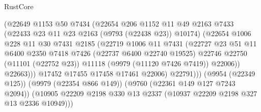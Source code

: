 \begin{lexlean}{RustCore}
\begin{coremodule}
                                  (@22649
                                    @1153
                                    @50
                                    @7434
                                    (@22654
                                      @206
                                      @1152
                                      @11
                                      @49
                                      @2163
                                      @7433
                                      (@22433 @23 @11 @23 @2163 (@9793 (@22438 @23)) @10174)
                                      (@22654
                                        @1006
                                        @228
                                        @11
                                        @30
                                        @7431
                                        @2185
                                        (@22719
                                          @1006
                                          @11
                                          @7431
                                          (@22727
                                            @23
                                            @51
                                            @11
                                            @6400
                                            @2350
                                            @7418
                                            @7426
                                            (@22737 @6400 @22740 @19525)
                                            @22746
                                            @22750
                                            (@11101 (@22752 @23))
                                            @11118
                                            (@9979 (@11120 @7426 @7419))
                                            @22006))
                                        @22663)))
                                  @17452
                                  @17455
                                  @17458
                                  @17461
                                  @22006)
                                @22791)))
                          (@9954 (@22349 @125))
                          (@9979 (@22354 @866 @149))
                          (@9760 (@22361 @149 @127 @7243 @2094))
                          (@10905
                            @22209
                            @2198
                            @330
                            @13
                            @2337
                            (@10937 @22209 @2198 @327 @13 @2336 @10949)))

\end{coremodule}
\end{lexlean}
